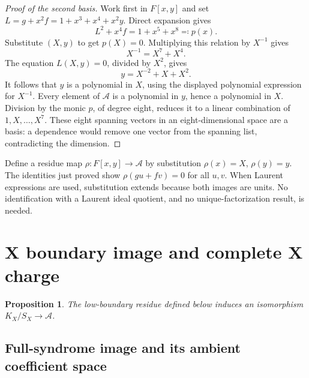 \documentclass{article}
\newtheorem{proposition}{Proposition}
\begin{document}
\begin{proof}[Proof of the second basis]
  Work first in \(F[x,y]\) and set \(L = g + x^2 f = 1 + x^3 + x^4 + x^2 y\). Direct
  expansion gives
  \begin{equation}
    L^2 + x^4 f = 1 + x^5 + x^8 \eqqcolon p(x).
  \end{equation}
  Substitute \((X, y)\) to get \(p(X) = 0\). Multiplying this relation by \(X^{-1}\) gives
  \begin{equation}
    X^{-1} = X^7 + X^4.
  \end{equation}
  The equation \(L(X,y) = 0\), divided by \(X^2\), gives
  \begin{equation}
    y = X^{-2} + X + X^2.
  \end{equation}
  It follows that \(y\) is a polynomial in \(X\), using the displayed polynomial expression
  for \(X^{-1}\). Every element of \(\mathcal{A}\) is a polynomial in \(y\), hence a
  polynomial in \(X\). Division by the monic \(p\), of degree eight, reduces it to a linear
  combination of \(1, X, \dots, X^7\). These eight spanning vectors in an eight-dimensional
  space are a basis: a dependence would remove one vector from the spanning list,
  contradicting the dimension.
\end{proof}

Define a residue map \(\rho \colon F[x,y] \to \mathcal{A}\) by substitution \(\rho(x) = X\),
\(\rho(y) = y\). The identities just proved show \(\rho(gu + fv) = 0\) for all \(u, v\). When
Laurent expressions are used, substitution extends because both images are units. No
identification with a Laurent ideal quotient, and no unique-factorization result, is needed.

\section{X boundary image and complete X charge}\label{sec:x-charge}

\begin{proposition}\label{prop:x-charge}
  The low-boundary residue defined below induces an isomorphism
  \(K_X/S_X \to \mathcal{A}\).
\end{proposition}

\subsection{Full-syndrome image and its ambient coefficient space}\label{sec:x-image}
\end{document}
